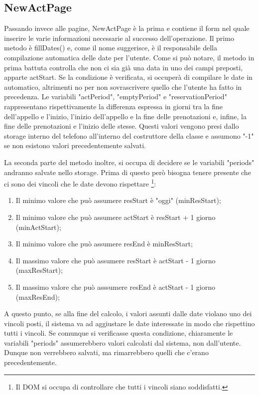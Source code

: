 \documentclass[Lau, oneside]{sapthesis}%
\begin{document}
\subsection{NewActPage}
Passando invece alle pagine, NewActPage è la prima e contiene il form nel quale inserire le varie informazioni necessarie al successo dell'operazione. Il primo metodo è fillDates() e, come il nome suggerisce, è il responsabile della compilazione automatica delle date per l'utente. Come si può notare, il metodo in prima battuta controlla che non ci sia già una data in uno dei campi preposti, apparte actStart. Se la condizione è verificata, si occuperà di compilare le date in automatico, altrimenti no per non sovrascrivere quello che l'utente ha fatto in precedenza.
Le variabili "actPeriod", "emptyPeriod" e "reservationPeriod" rappresentano rispettivamente la differenza espressa in giorni tra la fine dell'appello e l'inizio, l'inizio dell'appello e la fine delle prenotazioni e, infine, la fine delle prenotazioni e l'inizio delle stesse. Questi valori vengono presi dallo storage interno del telefono all'interno del costruttore della classe e assumono "-1" se non esistono valori precedentemente salvati.

La seconda parte del metodo inoltre, si occupa di decidere se le variabili "periods" andranno salvate nello storage. Prima di questo però bisogna tenere presente che ci sono dei vincoli che le date devono rispettare \footnote{Il DOM si occupa di controllare che tutti i vincoli siano soddisfatti.}:
\begin{enumerate}
	\item Il minimo valore che può assumere resStart è "oggi" (minResStart);
	\item Il minimo valore che può assumere actStart è resStart + 1 giorno (minActStart);
	\item Il minimo valore che può assumere resEnd è minResStart;
	\item Il massimo valore che può assumere resStart è actStart - 1 giorno (maxResStart);
	\item Il massimo valore che può asssumere resEnd è  actStart - 1 giorno (maxResEnd);
\end{enumerate}
A questo punto, se alla fine del calcolo, i valori assunti dalle date violano uno dei vincoli posti, il sistema va ad aggiustare le date interessate in modo che rispettino tutti i vincoli. Se comunque si verificasse questa condizione, chiaramente le variabili "periods" assumerebbero valori calcolati dal sistema, non dall'utente. Dunque non verrebbero salvati, ma rimarrebbero quelli che c'erano precedentemente.
\end{document}
